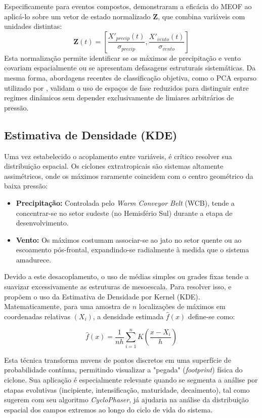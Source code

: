 Especificamente para eventos compostos, \citet{liang2018multivariate} demonstraram a eficácia do MEOF ao aplicá-lo sobre um vetor de estado normalizado $\mathbf{Z}$, que combina variáveis com unidades distintas:
\begin{equation}
    \mathbf{Z}(t) = \left[ \frac{X'_{precip}(t)}{\sigma_{precip}}, \frac{X'_{vento}(t)}{\sigma_{vento}} \right]
\end{equation}
Esta normalização permite identificar se os máximos de precipitação e vento covariam espacialmente ou se apresentam defasagens estruturais sistemáticas. Da mesma forma, abordagens recentes de classificação objetiva, como o PCA esparso utilizado por \citet{corner2025classification}, validam o uso de espaços de fase reduzidos para distinguir entre regimes dinâmicos sem depender exclusivamente de limiares arbitrários de pressão.


\subsection{Estimativa de Densidade (KDE)}\label{subsec:mt_kde_asimetria}
Uma vez estabelecido o acoplamento entre variáveis, é crítico resolver sua distribuição espacial. Os ciclones extratropicais são sistemas altamente assimétricos, onde os máximos raramente coincidem com o centro geométrico da baixa pressão:

\begin{itemize}
    \item \textbf{Precipitação:} Controlada pelo \textit{Warm Conveyor Belt} (WCB), tende a concentrar-se no setor sudeste (no Hemisfério Sul) durante a etapa de desenvolvimento. %
    \item \textbf{Vento:} Os máximos costumam associar-se ao jato no setor quente ou ao escoamento pós-frontal, expandindo-se radialmente à medida que o sistema amadurece.
\end{itemize}

Devido a este desacoplamento, o uso de médias simples ou grades fixas tende a suavizar excessivamente as estruturas de mesoescala. Para resolver isso, \citet{priestley2022improved} e \citet{han2025system} propõem o uso da Estimativa de Densidade por Kernel (KDE). Matematicamente, para uma amostra de $n$ localizações de máximos em coordenadas relativas $(X_i)$, a densidade estimada $\hat{f}(x)$ define-se como:

\begin{equation}
    \hat{f}(x) = \frac{1}{nh} \sum_{i=1}^{n} K\left(\frac{x - X_i}{h}\right)
\end{equation}

Esta técnica transforma nuvens de pontos discretos em uma superfície de probabilidade contínua, permitindo visualizar a "pegada" (\textit{footprint}) física do ciclone. Sua aplicação é especialmente relevante quando se segmenta a análise por etapas evolutivas (incipiente, intensificação, maturidade, decaimento), tal como sugerem \citet{coutodesouza2024new} com seu algoritmo \textit{CycloPhaser}, já ajudaria na análise da distribuição espacial dos campos extremos ao longo do ciclo de vida do sistema.